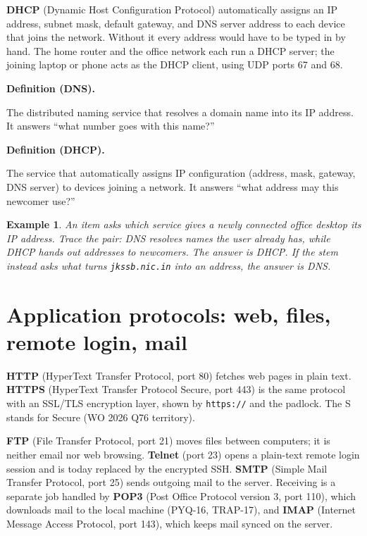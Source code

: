 \documentclass[11pt]{article}
\newtheorem{example}{Example}[section]
\newenvironment{definitionbox}[1]{%
  \par\noindent\textbf{Definition (#1).}\ \itshape
}{\par\vspace{0.3em}}
\begin{document}
\textbf{DHCP} (Dynamic Host Configuration Protocol) automatically assigns an
IP address, subnet mask, default gateway, and DNS server address to each
device that joins the network. Without it every address would have to be
typed in by hand. The home router and the office network each run a DHCP
server; the joining laptop or phone acts as the DHCP client, using UDP ports
67 and 68.

\begin{definitionbox}{DNS}
The distributed naming service that resolves a domain name into its IP
address. It answers ``what number goes with this name?''
\end{definitionbox}

\begin{definitionbox}{DHCP}
The service that automatically assigns IP configuration (address, mask,
gateway, DNS server) to devices joining a network. It answers ``what address
may this newcomer use?''
\end{definitionbox}

\begin{example}
An item asks which service gives a newly connected office desktop its IP
address. Trace the pair: DNS resolves names the user already has, while DHCP
hands out addresses to newcomers. The answer is DHCP. If the stem instead
asks what turns \texttt{jkssb.nic.in} into an address, the answer is DNS.
\end{example}

\section{Application protocols: web, files, remote login, mail}
\textbf{HTTP} (HyperText Transfer Protocol, port 80) fetches web pages in
plain text. \textbf{HTTPS} (HyperText Transfer Protocol Secure, port 443) is
the same protocol with an SSL/TLS encryption layer, shown by
\texttt{https://} and the padlock. The S stands for Secure (WO 2026 Q76
territory).

\textbf{FTP} (File Transfer Protocol, port 21) moves files between computers;
it is neither email nor web browsing. \textbf{Telnet} (port 23) opens a
plain-text remote login session and is today replaced by the encrypted SSH.
\textbf{SMTP} (Simple Mail Transfer Protocol, port 25) sends outgoing mail to
the server. Receiving is a separate job handled by \textbf{POP3} (Post Office
Protocol version 3, port 110), which downloads mail to the local machine
(PYQ-16, TRAP-17), and \textbf{IMAP} (Internet Message Access Protocol, port
143), which keeps mail synced on the server.
\end{document}

